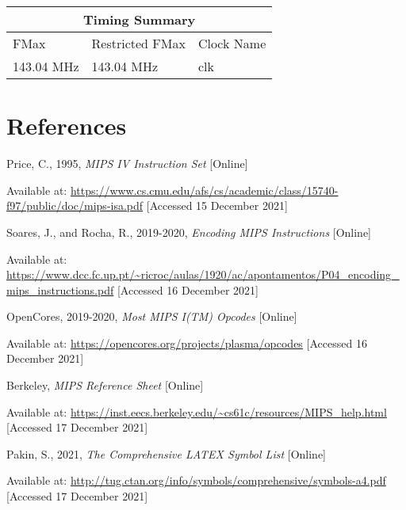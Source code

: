 \documentclass{article}
\begin{document}
\begin{tabular}{ |p{3cm}|p{3cm}|p{3cm}|  }
\hline
\multicolumn{3}{|c|}{Timing Summary} \\
\hline
FMax& Restricted FMax & Clock Name \\
\hline
143.04 MHz & 143.04 MHz & clk \\
\hline
\end{tabular}
\hfill \break
\hfill \break

\section{References}

Price, C., 1995,  \emph{MIPS IV Instruction Set} [Online]

Available at: \url{https://www.cs.cmu.edu/afs/cs/academic/class/15740-f97/public/doc/mips-isa.pdf} [Accessed 15 December 2021]

Soares, J., and Rocha, R., 2019-2020,  \emph{Encoding MIPS Instructions} [Online]

Available at: \url{https://www.dcc.fc.up.pt/~ricroc/aulas/1920/ac/apontamentos/P04_encoding_mips_instructions.pdf} [Accessed 16 December 2021]

OpenCores, 2019-2020,  \emph{Most MIPS I(TM) Opcodes} [Online]

Available at: \url{https://opencores.org/projects/plasma/opcodes} [Accessed 16 December 2021]

Berkeley, \emph{MIPS Reference Sheet} [Online]

Available at: \url{https://inst.eecs.berkeley.edu/~cs61c/resources/MIPS_help.html} [Accessed 17 December 2021]

Pakin, S., 2021, \emph{The Comprehensive LATEX Symbol List} [Online]

Available at: \url{http://tug.ctan.org/info/symbols/comprehensive/symbols-a4.pdf} [Accessed 17 December 2021]
\end{document}
